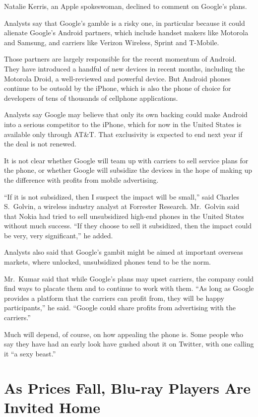 ﻿\documentclass[12pt]{article}
\begin{document}
Natalie Kerris, an Apple spokeswoman, declined to comment on Google's plans.

Analysts say that Google's gamble is a risky one, in particular because it could alienate Google's
Android partners, which include handset makers like Motorola and Samsung, and carriers like Verizon
Wireless, Sprint and T-Mobile.

Those partners are largely responsible for the recent momentum of Android. They have introduced a
handful of new devices in recent months, including the Motorola Droid, a well-reviewed and powerful
device. But Android phones continue to be outsold by the iPhone, which is also the phone of choice
for developers of tens of thousands of cellphone applications.

Analysts say Google may believe that only its own backing could make Android into a serious
competitor to the iPhone, which for now in the United States is available only through AT\&T. That
exclusivity is expected to end next year if the deal is not renewed.

It is not clear whether Google will team up with carriers to sell service plans for the phone, or
whether Google will subsidize the devices in the hope of making up the difference with profits from
mobile advertising.

``If it is not subsidized, then I suspect the impact will be small,'' said Charles S.~Golvin, a
wireless industry analyst at Forrester Research. Mr.~Golvin said that Nokia had tried to sell
unsubsidized high-end phones in the United States without much success. ``If they choose to sell it
subsidized, then the impact could be very, very significant,'' he added.

Analysts also said that Google's gambit might be aimed at important overseas markets, where
unlocked, unsubsidized phones tend to be the norm.

Mr.~Kumar said that while Google's plans may upset carriers, the company could find ways to
placate\cite{placate} them and to continue to work with them. ``As long as Google provides a
platform that the carriers can profit from, they will be happy participants,'' he said. ``Google
could share profits from advertising with the carriers.''

Much will depend, of course, on how appealing the phone is. Some people who say they have had an
early look have gushed about it on Twitter, with one calling it ``a sexy beast.''

\section{As Prices Fall, Blu-ray Players Are Invited Home}
\end{document}
